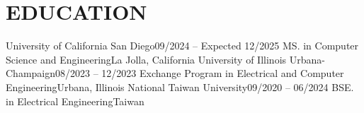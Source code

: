 \section{EDUCATION}
  \resumeSubHeadingListStart
    \resumeSubheading
      {University of California San Diego}{09/2024 -- Expected 12/2025}
      {MS. in Computer Science and Engineering}{La Jolla, California}
      \resumeItemListStart
      \resumeItemListEnd
    \vspace{-5pt}
    \resumeSubheading
      {University of Illinois Urbana-Champaign}{08/2023 -- 12/2023}
      {Exchange Program in Electrical and Computer Engineering}{Urbana, Illinois}
      \resumeItemListStart
      \resumeItemListEnd
    \vspace{-5pt}
    \resumeSubheading
      {National Taiwan University}{09/2020 -- 06/2024}
      {BSE. in Electrical Engineering}{Taiwan}
        \resumeItemListStart
        \resumeItemListEnd
    \vspace{-5pt}
    \resumeSubHeadingListEnd